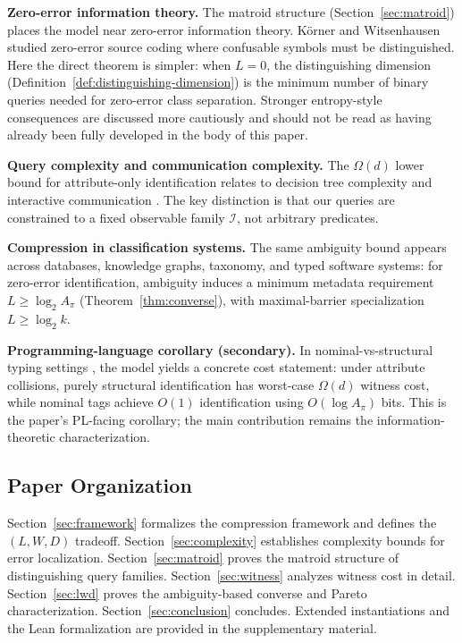 \textbf{Zero-error information theory.} The matroid structure (Section~\ref{sec:matroid}) places the model near zero-error information theory. K\"orner \cite{korner1973coding} and Witsenhausen \cite{witsenhausen1976zero} studied zero-error source coding where confusable symbols must be distinguished. Here the direct theorem is simpler: when $L = 0$, the distinguishing dimension (Definition~\ref{def:distinguishing-dimension}) is the minimum number of binary queries needed for zero-error class separation. Stronger entropy-style consequences are discussed more cautiously and should not be read as having already been fully developed in the body of this paper.

\textbf{Query complexity and communication complexity.} The $\Omega(d)$ lower bound for attribute-only identification relates to decision tree complexity \cite{buhrman2002complexity} and interactive communication \cite{orlitsky1991worst}. The key distinction is that our queries are constrained to a fixed observable family $\mathcal{I}$, not arbitrary predicates.

\textbf{Compression in classification systems.} The same ambiguity bound appears across databases, knowledge graphs, taxonomy, and typed software systems: for zero-error identification, ambiguity induces a minimum metadata requirement $L \ge \log_2 A_\pi$ (Theorem~\ref{thm:converse}), with maximal-barrier specialization $L \ge \log_2 k$.

\textbf{Programming-language corollary (secondary).} In nominal-vs-structural typing settings \cite{Cardelli1985, cook1990inheritance}, the model yields a concrete cost statement: under attribute collisions, purely structural identification has worst-case $\Omega(d)$ witness cost, while nominal tags achieve $O(1)$ identification using $O(\log A_\pi)$ bits. This is the paper's PL-facing corollary; the main contribution remains the information-theoretic characterization.

\subsection{Paper Organization}

Section~\ref{sec:framework} formalizes the compression framework and defines the $(L, W, D)$ tradeoff. Section~\ref{sec:complexity} establishes complexity bounds for error localization. Section~\ref{sec:matroid} proves the matroid structure of distinguishing query families. Section~\ref{sec:witness} analyzes witness cost in detail. Section~\ref{sec:lwd} proves the ambiguity-based converse and Pareto characterization. Section~\ref{sec:conclusion} concludes. Extended instantiations and the Lean formalization are provided in the supplementary material.
